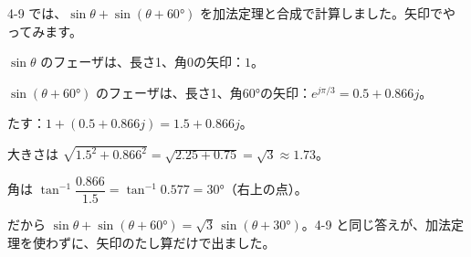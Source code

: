 4-9 では、$\sin\theta+\sin(\theta+60°)$ を加法定理と合成で計算しました。矢印でやってみます。
\begin{enumerate}[label={\bkcircled[\bkTF]{\arabic*}}, leftmargin=2.4\zw, itemsep=2pt, topsep=2pt]
\item $\sin\theta$ のフェーザは、長さ1、角0の矢印：$1$。
\item $\sin(\theta+60°)$ のフェーザは、長さ1、角60°の矢印：$e^{j\pi/3}=0.5+0.866j$。
\item たす：$1+(0.5+0.866j)=1.5+0.866j$。
\item 大きさは $\sqrt{1.5^2+0.866^2}=\sqrt{2.25+0.75}=\sqrt3\approx1.73$。
\item 角は $\tan^{-1}\dfrac{0.866}{1.5}=\tan^{-1}0.577=30°$（右上の点）。
\end{enumerate}
だから $\sin\theta+\sin(\theta+60°)=\sqrt3\,\sin(\theta+30°)$。4-9 と同じ答えが、加法定理を使わずに、矢印のたし算だけで出ました。

